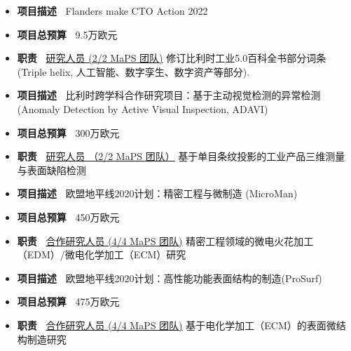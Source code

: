 \documentclass{resume}
\begin{document}
\label{project:project:}
\begin{itemize}[parsep=0.5ex]
  \item \textbf{项目描述~} Flanders make CTO Action 2022
  \item \textbf{项目总预算~} \SLASH9.5万欧元
  \item \textbf{职责~} \underline{研究人员 (2/2 MaPS 团队)}  修订比利时工业5.0百科全书部分词条 (Triple helix, 人工智能、数字孪生、数字资产等部分).
\end{itemize}

\label{project:ADAVI}
\begin{itemize}[parsep=0.5ex]
  \item \textbf{项目描述~} 比利时跨学科合作研究项目：基于主动视觉检测的异常检测(Anomaly Detection by Active Visual Inspection, ADAVI)
  \item \textbf{项目总预算~} \SLASH300万欧元
  \item \textbf{职责~} \underline{研究人员 （2/2  MaPS 团队）} 基于单目条纹投影的工业产品三维测量与表面缺陷检测
\end{itemize}

\label{project:MicroMan}
\begin{itemize}[parsep=0.5ex]
  \item \textbf{项目描述~} 欧盟地平线2020计划：精密工程与微制造 (MicroMan)
  \item \textbf{项目总预算~} \SLASH450万欧元
  \item \textbf{职责~} \underline{合作研究人员 (4/4 MaPS 团队)} 精密工程领域的微电火花加工（EDM）/微电化学加工（ECM）研究
\end{itemize}

\label{project:ProSurf}
\begin{itemize}[parsep=0.5ex]
  \item \textbf{项目描述~} 欧盟地平线2020计划：高性能功能表面结构的制造(ProSurf)
  \item \textbf{项目总预算~} \SLASH475万欧元
  \item \textbf{职责~} \underline{合作研究人员 (4/4 MaPS 团队)} 基于电化学加工（ECM）的表面微结构制造研究
\end{itemize}

\end{document}
